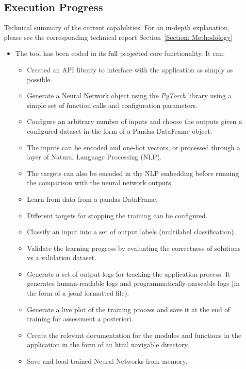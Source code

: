\documentclass[a4paper, 11pt]{report}
\begin{document}
\subsection{Execution  Progress}
    Technical summary of the current capabilities. For an in-depth explanation, please see the corresponding technical report Section~\ref{Section: Methodology}
    \begin{itemize}
        \item The tool has been coded in its full projected core functionality. It can:
        \begin{itemize}
            \item Created an API library to interface with the application as simply as possible.
            \item Generate a Neural Network object using the \textit{PyTorch} library using a simple set of function calls and configuration parameters.
            \item Configure an arbitrary number of inputs and choose the outputs given a configured dataset in the form of a Pandas DataFrame object.
            \item The inputs can be encoded and one-hot vectors, or processed through a layer of Natural Language Processing (NLP).
            \item The targets can also be encoded in the NLP embedding before running the comparison with the neural network outputs.
            \item Learn from data from a pandas DataFrame.
            \item Different targets for stopping the training can be configured.
            \item Classify an input into a set of output labels (multilabel classification).
            \item Validate the learning progress by evaluating the correctness of solutions vs a validation dataset.
            \item Generate a set of output logs for tracking the application process. It generates human-readable logs and programmatically-parseable logs (in the form of a jsonl formatted file).
            \item Generate a live plot of the training process and save it at the end of training for assessment a posteriori.
            \item Create the relevant documentation for the modules and functions in the application in the form of an html navigable directory.
            \item Save and load trained Neural Networks from memory.

\end{itemize}
\end{itemize}
\end{document}
